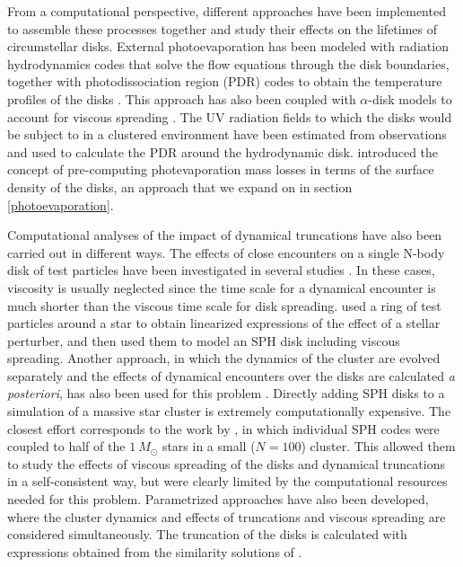 \documentclass[fleqn,usenatbib]{mnras}
\begin{document}
From a computational perspective, different approaches have been implemented to assemble these processes together and study their effects on the lifetimes of circumstellar disks. External photoevaporation has been modeled with radiation hydrodynamics codes that solve the flow equations through the disk boundaries, together with photodissociation region (PDR) codes to obtain the temperature profiles of the disks \citep[e.g.][]{haworth2016,facchini2016}. This approach has also been coupled with $\alpha$-disk models to account for viscous spreading \citep[e.g.][]{adams2004,anderson2013,gorti2015,rosotti2017}. The UV radiation fields to which the disks would be subject to in a clustered environment have been estimated from observations and used to calculate the PDR around the hydrodynamic disk. \citet{haworth2018a} introduced the concept of pre-computing photevaporation mass losses in terms of the surface density of the disks, an approach that we expand on in section \ref{photoevaporation}. 

Computational analyses of the impact of dynamical truncations have also been carried out in different ways. The effects of close encounters on a single N-body disk of test particles have been investigated in several studies \citep[e.g.][]{breslau2014,jilkova2016,bhandare2016,pfalzner2018}. In these cases, viscosity is usually neglected since the time scale for a dynamical encounter is much shorter than the viscous time scale for disk spreading. \citet{winter2018,winter2018a} used a ring of test particles around a star to obtain linearized expressions of the effect of a stellar perturber, and then used them to model an SPH disk including viscous spreading. Another approach, in which the dynamics of the cluster are evolved separately and the effects of dynamical encounters over the disks are calculated \textit{a posteriori}, has also been used for this problem \citep[e.g.][]{olczak2006,olczak2010,malmberg2011,steinhausen2014,vincke2015,vincke2016,vincke2018}. Directly adding SPH disks to a simulation of a massive star cluster is extremely computationally expensive. The closest effort corresponds to the work by \citet{rosotti2014}, in which individual SPH codes were coupled to half of the $\SI{1}{M_\odot}$ stars in a small ($N=100$) cluster. This allowed them to study the effects of viscous spreading of the disks and dynamical truncations in a self-consistent way, but were clearly limited by the computational resources needed for this problem. Parametrized approaches have also been developed, where the cluster dynamics and effects of truncations \citep{portegieszwart2016} and viscous spreading \citep{concha-ramirez2019} are considered simultaneously. The truncation of the disks is calculated with expressions obtained from the similarity solutions of \citet{lynden-bell1974}.
\end{document}
